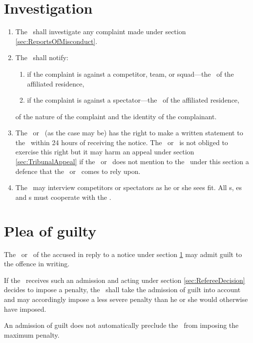\documentclass[12pt]{report}
\begin{document}
  \section{Investigation}\label{sec:Investigation}
  \begin{enumerate}
    \item The \Referee\ shall investigate any complaint made  under section \ref{sec:ReportsOfMisconduct}.
    \item The \Referee\ shall notify:
    \begin{enumerate}
      \item if the complaint is against a competitor, team, or squad---the \Captain\ of the affiliated residence,
      \item if the complaint is against a spectator---the \President\ of the affiliated residence,
    \end{enumerate}
    of the nature of the complaint and the identity of the complainant.
    \item The \Captain\ or \President\ (as the case may be) has the right to make a written statement to the \Referee \ within 24 hours of receiving the notice. The \Captain\ or \President\ is not obliged to exercise this right but it may harm an appeal under section \ref{sec:TribunalAppeal} if the \Captain\ or \President\ does not mention to the \Referee\ under this section a defence that the \Captain\ or \President\ comes to rely upon.
    \item The \Referee\ may interview competitors or spectators as he or she sees fit. All \competitor s, \Captain es and  \President s must cooperate with the \Referee.
    \end{enumerate}
    \section{Plea of guilty}
  \begin{fenumerate}
    \item The \Captain\ or \President\ of the accused in reply to a notice under section \ref{sec:Investigation} may admit guilt to the offence in writing.
    \item If the \Referee\ receives such an admission and acting under section \ref{sec:RefereeDecision} decides to impose a penalty, the \Referee\ shall take the admission of guilt into account and may accordingly impose a less severe penalty than he or she would otherwise have imposed.
    \item An admission of guilt does not automatically preclude the \Referee\ from imposing the maximum penalty.
  \end{fenumerate}
\end{document}
